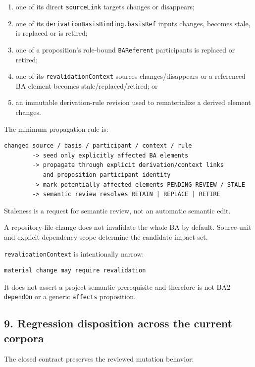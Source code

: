 \documentclass[11pt,a4paper]{article}
\providecommand{\tightlist}{\setlength{\itemsep}{0pt}\setlength{\parskip}{0pt}}
\begin{document}
\begin{enumerate}
\def\labelenumi{\arabic{enumi}.}
\tightlist
\item
  one of its direct \texttt{sourceLink} targets changes or disappears;
\item
  one of its \texttt{derivationBasisBinding.basisRef} inputs changes, becomes stale, is replaced or is retired;
\item
  one of a proposition's role-bound \texttt{BAReferent} participants is replaced or retired;
\item
  one of its \texttt{revalidationContext} sources changes/disappears or a referenced BA element becomes stale/replaced/retired; or
\item
  an immutable derivation-rule revision used to rematerialize a derived element changes.
\end{enumerate}

The minimum propagation rule is:

\begin{verbatim}
changed source / basis / participant / context / rule
        -> seed only explicitly affected BA elements
        -> propagate through explicit derivation/context links
           and proposition participant identity
        -> mark potentially affected elements PENDING_REVIEW / STALE
        -> semantic review resolves RETAIN | REPLACE | RETIRE
\end{verbatim}

Staleness is a request for semantic review, not an automatic semantic edit.

A repository-file change does not invalidate the whole BA by default. Source-unit and explicit dependency scope determine the candidate impact set.

\texttt{revalidationContext} is intentionally narrow:

\begin{verbatim}
material change may require revalidation
\end{verbatim}

It does not assert a project-semantic prerequisite and therefore is not BA2 \texttt{dependOn} or a generic \texttt{affects} proposition.

\subsection{9. Regression disposition across the current corpora}\label{regression-disposition-across-the-current-corpora}

The closed contract preserves the reviewed mutation behavior:
\end{document}
